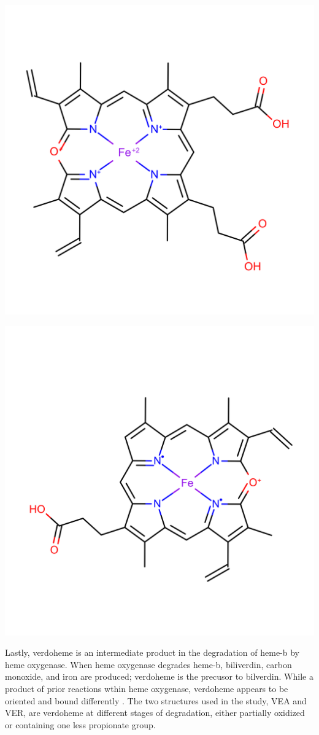 \documentclass[a4paper, nobind]{templates/ociamthesis}
\let\origfigure\figure
\let\endorigfigure\endfigure
\renewenvironment{figure}[1][2] {
    \expandafter\origfigure\expandafter[H]
} {
    \endorigfigure
}
\begin{document}
\begin{figure}

{\centering \includegraphics[width=0.5\linewidth]{figures/VEA} 

}

\caption{Verdoheme (VEA)}\label{fig:structVEA}
\end{figure}
\begin{figure}

{\centering \includegraphics[width=0.5\linewidth]{figures/VER} 

}

\caption{Verdoheme (VER)}\label{fig:structVER}
\end{figure}

Lastly, verdoheme is an intermediate product in the degradation of heme-b by heme oxygenase. When heme oxygenase degrades heme-b, biliverdin, carbon monoxide, and iron are produced; verdoheme is the precusor to bilverdin\autocite{Lai2010,Sato2007}. While a product of prior reactions wthin heme oxygenase, verdoheme appears to be oriented and bound differently \autocite{Lad2004}. The two structures used in the study, VEA and VER, are verdoheme at different stages of degradation, either partially oxidized or containing one less propionate group.
\end{document}
